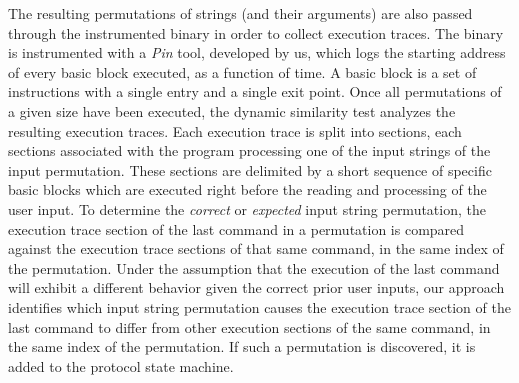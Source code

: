\documentclass{sig-alternate-05-2015}
\begin{document}
The resulting permutations of strings (and their arguments) are also passed through the instrumented binary in order to collect execution traces.
The binary is instrumented with a \textit{Pin} tool, developed by us, which logs the starting address of every basic block executed, as a function of time.
A basic block is a set of instructions with a single entry and a single exit point.
Once all permutations of a given size have been executed, the dynamic similarity test analyzes the resulting execution traces.
Each execution trace is split into sections, each sections associated with the program processing one of the input strings of the input permutation.
These sections are delimited by a short sequence of specific basic blocks which are executed right before the reading and processing of the user input.
To determine the \textit{correct} or \textit{expected} input string permutation, the execution trace section of the last command in a permutation is compared against the execution trace sections of that same command, in the same index of the permutation.
Under the assumption that the execution of the last command will exhibit a different behavior given the correct prior user inputs, our approach identifies which input string permutation causes the execution trace section of the last command to differ from other execution sections of the same command, in the same index of the permutation.
If such a permutation is discovered, it is added to the protocol state machine.
\end{document}
